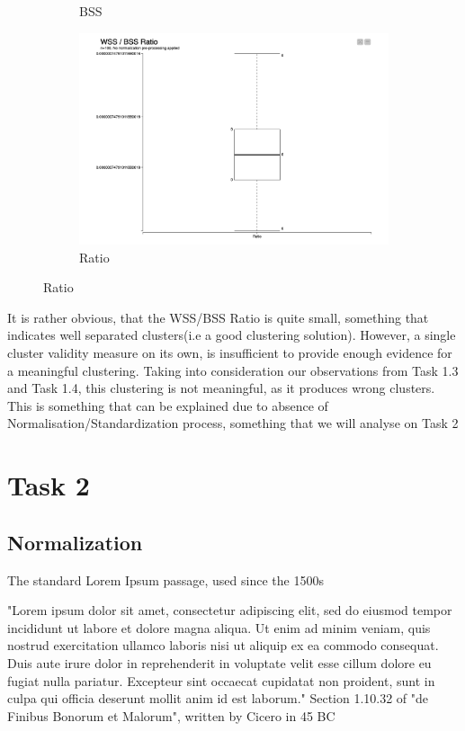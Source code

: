 \documentclass[11pt]{article}
\begin{document}
\begin{figure}[H]
\begin{subfigure}{0.4\textwidth}
						\caption{BSS}
						\label{fig:second}
					\end{subfigure}
					\hfill
					\begin{subfigure}{0.4\textwidth}
						\includegraphics[width=\textwidth]{res/t1/t15/t15-Ratio-plot}
						\caption{Ratio}
						\label{fig:third}
					\end{subfigure}
					\label{fig:figures}	
				\end{figure}
				\fi
				It is rather obvious, that the WSS/BSS Ratio is quite small, something that indicates well separated clusters(i.e a good clustering solution). However, a single cluster validity measure on its own, is insufficient to provide enough evidence for a meaningful clustering. Taking into consideration our observations from Task 1.3 and Task 1.4, this clustering \cite{???}is not meaningful, as it produces wrong clusters. This is something that can be explained due to absence of Normalisation/Standardization process, something that we will analyse on Task 2
	\section*{Task 2}
		\subsection*{Normalization}
			The standard Lorem Ipsum passage, used since the 1500s
			
			"Lorem ipsum dolor sit amet, consectetur adipiscing elit, sed do eiusmod tempor incididunt ut labore et dolore magna aliqua. Ut enim ad minim veniam, quis nostrud exercitation ullamco laboris nisi ut aliquip ex ea commodo consequat. Duis aute irure dolor in reprehenderit in voluptate velit esse cillum dolore eu fugiat nulla pariatur. Excepteur sint occaecat cupidatat non proident, sunt in culpa qui officia deserunt mollit anim id est laborum."
			Section 1.10.32 of "de Finibus Bonorum et Malorum", written by Cicero in 45 BC
\end{document}
